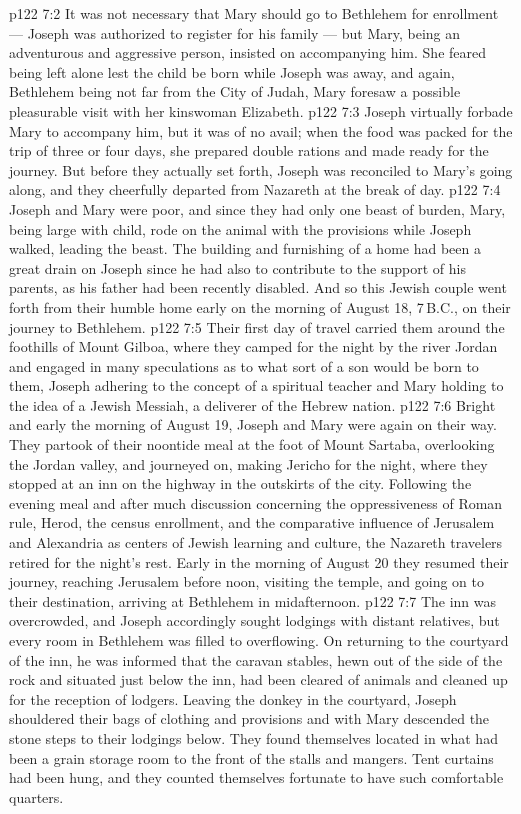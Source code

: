 \vs p122 7:2 It was not necessary that Mary should go to Bethlehem for enrollment --- Joseph was authorized to register for his family --- but Mary, being an adventurous and aggressive person, insisted on accompanying him. She feared being left alone lest the child be born while Joseph was away, and again, Bethlehem being not far from the City of Judah, Mary foresaw a possible pleasurable visit with her kinswoman Elizabeth.
\vs p122 7:3 Joseph virtually forbade Mary to accompany him, but it was of no avail; when the food was packed for the trip of three or four days, she prepared double rations and made ready for the journey. But before they actually set forth, Joseph was reconciled to Mary’s going along, and they cheerfully departed from Nazareth at the break of day.
\vs p122 7:4 Joseph and Mary were poor, and since they had only one beast of burden, Mary, being large with child, rode on the animal with the provisions while Joseph walked, leading the beast. The building and furnishing of a home had been a great drain on Joseph since he had also to contribute to the support of his parents, as his father had been recently disabled. And so this Jewish couple went forth from their humble home early on the morning of August 18, 7\,B.C., on their journey to Bethlehem.
\vs p122 7:5 Their first day of travel carried them around the foothills of Mount Gilboa, where they camped for the night by the river Jordan and engaged in many speculations as to what sort of a son would be born to them, Joseph adhering to the concept of a spiritual teacher and Mary holding to the idea of a Jewish Messiah, a deliverer of the Hebrew nation.
\vs p122 7:6 Bright and early the morning of August 19, Joseph and Mary were again on their way. They partook of their noontide meal at the foot of Mount Sartaba, overlooking the Jordan valley, and journeyed on, making Jericho for the night, where they stopped at an inn on the highway in the outskirts of the city. Following the evening meal and after much discussion concerning the oppressiveness of Roman rule, Herod, the census enrollment, and the comparative influence of Jerusalem and Alexandria as centers of Jewish learning and culture, the Nazareth travelers retired for the night’s rest. Early in the morning of August 20 they resumed their journey, reaching Jerusalem before noon, visiting the temple, and going on to their destination, arriving at Bethlehem in midafternoon.
\vs p122 7:7 The inn was overcrowded, and Joseph accordingly sought lodgings with distant relatives, but every room in Bethlehem was filled to overflowing. On returning to the courtyard of the inn, he was informed that the caravan stables, hewn out of the side of the rock and situated just below the inn, had been cleared of animals and cleaned up for the reception of lodgers. Leaving the donkey in the courtyard, Joseph shouldered their bags of clothing and provisions and with Mary descended the stone steps to their lodgings below. They found themselves located in what had been a grain storage room to the front of the stalls and mangers. Tent curtains had been hung, and they counted themselves fortunate to have such comfortable quarters.
